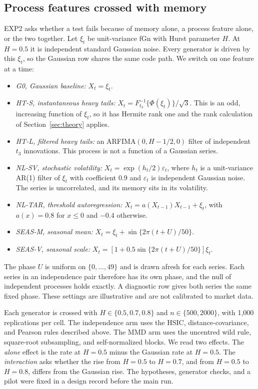 \documentclass[11pt]{article}
\theoremstyle{remark}
\begin{document}
\subsection{Process features crossed with memory}\label{sec:exp2-design}
EXP2 asks whether a test fails because of memory alone, a process feature alone, or the two together. Let $\xi_t$ be unit-variance fGn with Hurst parameter $H$. At $H=0.5$ it is independent standard Gaussian noise. Every generator is driven by this $\xi_t$, so the Gaussian row shares the same code path. We switch on one feature at a time:
\begin{itemize}[nosep]
\item \emph{G0, Gaussian baseline:} $X_t=\xi_t$.
\item \emph{HT-S, instantaneous heavy tails:} $X_t=F_{t_3}^{-1}\{\Phi(\xi_t)\}/\sqrt3$. This is an odd, increasing function of $\xi_t$, so it has Hermite rank one and the rank calculation of Section~\ref{sec:theory} applies.
\item \emph{HT-L, filtered heavy tails:} an ARFIMA$(0,H-1/2,0)$ filter of independent $t_3$ innovations. This process is not a function of a Gaussian series.
\item \emph{NL-SV, stochastic volatility:} $X_t=\exp(h_t/2)\varepsilon_t$, where $h_t$ is a unit-variance AR(1) filter of $\xi_t$ with coefficient $0.9$ and $\varepsilon_t$ is independent Gaussian noise. The series is uncorrelated, and its memory sits in its volatility.
\item \emph{NL-TAR, threshold autoregression:} $X_t=a(X_{t-1})X_{t-1}+\xi_t$, with $a(x)=0.8$ for $x\le0$ and $-0.4$ otherwise.
\item \emph{SEAS-M, seasonal mean:} $X_t=\xi_t+\sin\{2\pi(t+U)/50\}$.
\item \emph{SEAS-V, seasonal scale:} $X_t=[1+0.5\sin\{2\pi(t+U)/50\}]\xi_t$.
\end{itemize}
The phase $U$ is uniform on $\{0,\ldots,49\}$ and is drawn afresh for each series. Each series in an independence pair therefore has its own phase, and the null of independent processes holds exactly. A diagnostic row gives both series the same fixed phase. These settings are illustrative and are not calibrated to market data.

Each generator is crossed with $H\in\{0.5,0.7,0.8\}$ and $n\in\{500,2000\}$, with 1,000 replications per cell. The independence arm uses the HSIC, distance-covariance, and Pearson rules described above. The MMD arm uses the uncentred wild rule, square-root subsampling, and self-normalized blocks. We read two effects. The \emph{alone} effect is the rate at $H=0.5$ minus the Gaussian rate at $H=0.5$. The \emph{interaction} asks whether the rise from $H=0.5$ to $H=0.7$, and from $H=0.5$ to $H=0.8$, differs from the Gaussian rise. The hypotheses, generator checks, and a pilot were fixed in a design record before the main run.
\end{document}
